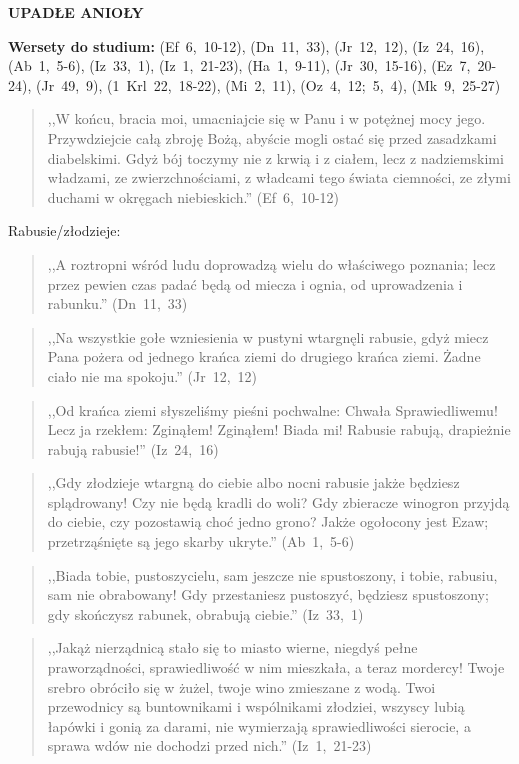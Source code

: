 \documentclass[10pt,a4paper,oneside]{article}
\begin{document}
\centerline{\textbf{\MakeUppercase{Upadłe Anioły}}}
\begin{center}
\textbf{Wersety do studium:} \mbox{(Ef 6, 10-12)}, \mbox{(Dn 11, 33)}, \mbox{(Jr 12, 12)}, \mbox{(Iz 24, 16)}, \mbox{(Ab 1, 5-6)}, \mbox{(Iz 33, 1)}, \mbox{(Iz 1, 21-23)}, \mbox{(Ha 1, 9-11)}, \mbox{(Jr 30, 15-16)}, \mbox{(Ez 7, 20-24)}, \mbox{(Jr 49, 9)}, \mbox{(1 Krl 22, 18-22)}, \mbox{(Mi 2, 11)}, \mbox{(Oz 4, 12; 5, 4)}, \mbox{(Mk 9, 25-27)}
\end{center}
\begin{quote}
,,W końcu, bracia moi, umacniajcie się w Panu i w potężnej mocy jego. Przywdziejcie całą zbroję Bożą, abyście mogli ostać się przed zasadzkami diabelskimi. Gdyż bój toczymy nie z krwią i z ciałem, lecz z nadziemskimi władzami, ze zwierzchnościami, z władcami tego świata ciemności, ze złymi duchami w okręgach niebieskich.'' \mbox{(Ef 6, 10-12)}
\end{quote}
Rabusie/złodzieje:
\begin{quote}
,,A roztropni wśród ludu doprowadzą wielu do właściwego poznania; lecz przez pewien czas padać będą od miecza i ognia, od uprowadzenia i rabunku.'' \mbox{(Dn 11, 33)}
\end{quote}
\begin{quote}
,,Na wszystkie gołe wzniesienia w pustyni wtargnęli rabusie, gdyż miecz Pana pożera od jednego krańca ziemi do drugiego krańca ziemi. Żadne ciało nie ma spokoju.'' \mbox{(Jr 12, 12)}
\end{quote}
\begin{quote}
,,Od krańca ziemi słyszeliśmy pieśni pochwalne: Chwała Sprawiedliwemu! Lecz ja rzekłem: Zginąłem! Zginąłem! Biada mi! Rabusie rabują, drapieżnie rabują rabusie!'' \mbox{(Iz 24, 16)}
\end{quote}
\begin{quote}
,,Gdy złodzieje wtargną do ciebie albo nocni rabusie jakże będziesz splądrowany! Czy nie będą kradli do woli? Gdy zbieracze winogron przyjdą do ciebie, czy pozostawią choć jedno grono? Jakże ogołocony jest Ezaw; przetrząśnięte są jego skarby ukryte.'' \mbox{(Ab 1, 5-6)}
\end{quote}
\begin{quote}
,,Biada tobie, pustoszycielu, sam jeszcze nie spustoszony, i tobie, rabusiu, sam nie obrabowany! Gdy przestaniesz pustoszyć, będziesz spustoszony; gdy skończysz rabunek, obrabują ciebie.'' \mbox{(Iz 33, 1)}
\end{quote}
\begin{quote}
,,Jakąż nierządnicą stało się to miasto wierne, niegdyś pełne praworządności, sprawiedliwość w nim mieszkała, a teraz mordercy! Twoje srebro obróciło się w żużel, twoje wino zmieszane z wodą. Twoi przewodnicy są buntownikami i wspólnikami złodziei, wszyscy lubią łapówki i gonią za darami, nie wymierzają sprawiedliwości sierocie, a sprawa wdów nie dochodzi przed nich.'' \mbox{(Iz 1, 21-23)}
\end{quote}
\end{document}
